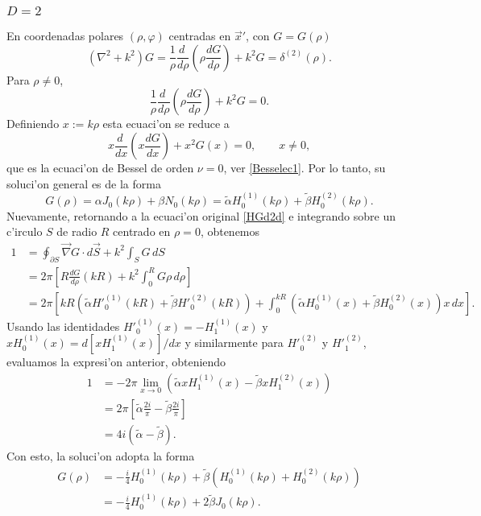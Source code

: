 \subsubsection{$D=2$}
En coordenadas polares $(\rho,\varphi)$ centradas en $\vec{x}'$, con $G=G(\rho)$
\begin{equation}\label{HGd2d}
(\nabla^2+k^2)G=\frac{1}{\rho}\frac{d\ }{d\rho}\left(\rho\frac{dG}{d\rho}\right)+k^2G=\delta^{(2)}(\rho).
\end{equation}
Para $\rho\neq 0$, 
\begin{equation}
\frac{1}{\rho}\frac{d\ }{d\rho}\left(\rho\frac{dG}{d\rho}\right)+k^2G=0.
\end{equation}
Definiendo $x:=k\rho$ esta ecuaci'on se reduce a
\begin{equation}
x\frac{d\ }{dx}\left(x\frac{dG}{dx}\right)+x^2G(x)=0, \qquad x\neq 0,
\end{equation}
que es la ecuaci'on de Bessel de orden $\nu=0$, ver \eqref{Besselec1}. Por lo tanto, su soluci'on general es de la forma
\begin{equation}
G(\rho)=\alpha J_0(k\rho)+\beta N_0(k\rho)=\tilde\alpha H^{(1)}_0(k\rho)+\tilde\beta H^{(2)}_0(k\rho).
\end{equation}
Nuevamente, retornando a la ecuaci'on original \eqref{HGd2d} e integrando sobre un c'irculo $S$ de radio $R$ centrado en $\rho=0$, obtenemos
\begin{align}
1 &= \oint_{\partial S}\vec\nabla G\cdot d\vec{S}+k^2\int_S G\,dS \\
&= 2\pi\left[R\frac{dG}{d\rho}(kR)+k^2\int_0^RG\rho\,d\rho\right] \\
&= 2\pi\left[kR\left(\tilde\alpha H'^{(1)}_0(kR)+\tilde\beta H'^{(2)}_0(kR)\right)+\int_0^{kR}\left(\tilde\alpha H^{(1)}_0(x)+\tilde\beta H^{(2)}_0(x)\right)x\,dx\right].
\end{align}
Usando las identidades $H'^{(1)}_0(x)=-H_1^{(1)}(x)$ y $xH_0^{(1)}(x)=d[xH_1^{(1)}(x)]/dx$ y similarmente para $H'^{(2)}_0$ y $H'^{(2)}_1$, evaluamos la expresi'on anterior, obteniendo
\begin{align}
1 &= -2\pi\lim_{x\to 0}\left(\tilde\alpha xH_1^{(1)}(x)-\tilde\beta xH_1^{(2)}(x)\right) \\
&= 2\pi\left[\tilde\alpha\frac{2i}{\pi} -\tilde\beta\frac{2i}{\pi} \right]\\ 
&= 4i(\tilde\alpha -\tilde\beta).
\end{align}
Con esto, la soluci'on adopta la forma
\begin{align}
G(\rho) &= -\frac{i}{4}H_0^{(1)}(k\rho)+\tilde\beta\left(H_0^{(1)}(k\rho)+H_0^{(2)}(k\rho)\right)\\
&= -\frac{i}{4}H_0^{(1)}(k\rho)+2\tilde\beta J_0(k\rho).
\end{align} 
